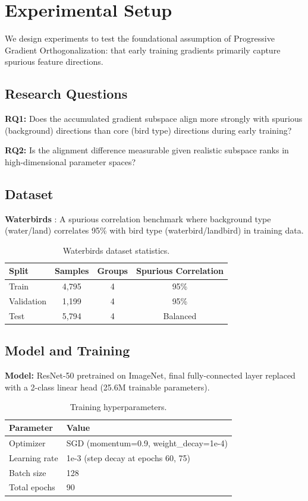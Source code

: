 \section{Experimental Setup}

We design experiments to test the foundational assumption of Progressive Gradient Orthogonalization: that early training gradients primarily capture spurious feature directions.

\subsection{Research Questions}

\textbf{RQ1:} Does the accumulated gradient subspace align more strongly with spurious (background) directions than core (bird type) directions during early training?

\textbf{RQ2:} Is the alignment difference measurable given realistic subspace ranks in high-dimensional parameter spaces?

\subsection{Dataset}

\textbf{Waterbirds} \citep{sagawa2020distributionally}: A spurious correlation benchmark where background type (water/land) correlates 95\% with bird type (waterbird/landbird) in training data.

\begin{table}[h]
\centering
\caption{Waterbirds dataset statistics.}
\begin{tabular}{@{}lccc@{}}
\toprule
Split & Samples & Groups & Spurious Correlation \\
\midrule
Train & 4,795 & 4 & 95\% \\
Validation & 1,199 & 4 & 95\% \\
Test & 5,794 & 4 & Balanced \\
\bottomrule
\end{tabular}
\end{table}

\subsection{Model and Training}

\textbf{Model:} ResNet-50 pretrained on ImageNet, final fully-connected layer replaced with a 2-class linear head (25.6M trainable parameters).

\begin{table}[h]
\centering
\caption{Training hyperparameters.}
\begin{tabular}{@{}ll@{}}
\toprule
Parameter & Value \\
\midrule
Optimizer & SGD (momentum=0.9, weight\_decay=1e-4) \\
Learning rate & 1e-3 (step decay at epochs 60, 75) \\
Batch size & 128 \\
Total epochs & 90 \\
\bottomrule
\end{tabular}
\end{table}

